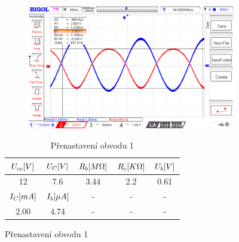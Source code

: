 \documentclass{article}
\begin{document}
\begin{figure}[H]
	\begin{minipage}[t]{0.6\textwidth}
    \vspace{-10mm}
    \begin{figure}[H]
      \includegraphics[width=\textwidth]{LAB/NewFile4.png}
      \caption{\label{obvod_z_laborky}}
    \end{figure}
  \end{minipage}
  \hfill
	\begin{minipage}[t]{0.35\textwidth}
    \begin{table}[H]
      \vspace{8mm}
      \hspace{-5mm}
      \small
      \begin{tabular}{|c|c|c|c|c|} 
        \hline
        \(U_{cc}\-[V]\) & \(U_{C}\-[V]\)  & \(R_b\-[M\Omega]\) & \(R_c\-[K\Omega]\) & \(U_{b}\-[V]\)  \\ \hline
        12              & 7.6             & 3.44               & 2.2                & 0.61            \\ \hline
        \hline
        \(I_{C}\-[mA]\) & \(I_{b}\-[\mu A]\) & - & - & - \\\hline
        2.00            & 4.74               & - & - & - \\\hline
      \end{tabular}
      \normalsize
      \caption{\label{tab_pracovni_bod_rozladeni1} Přenastavení obvodu 1}
    \end{table}
  \end{minipage}
\end{figure}
\end{document}
